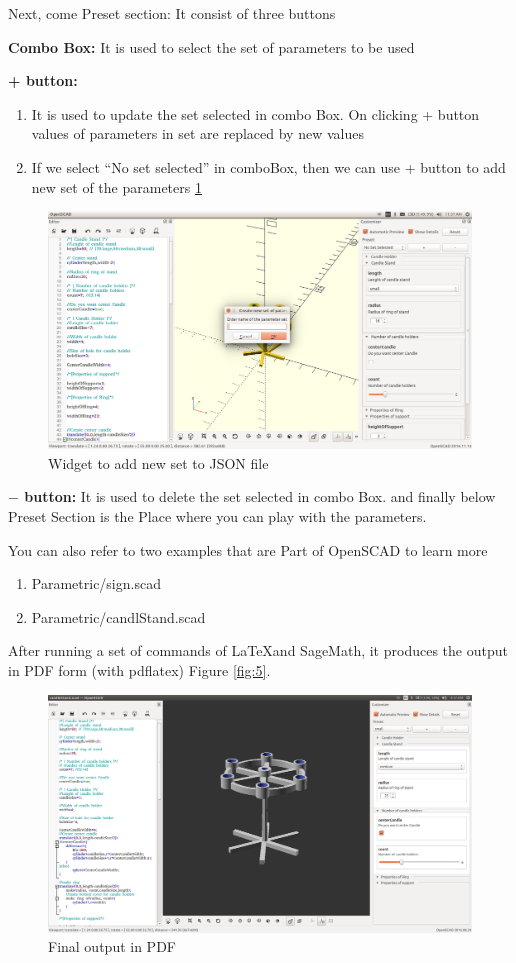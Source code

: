 Next, come Preset section: It consist of three buttons
\begin{description}
    \item \textbf{Combo Box:}
        It is used to select the set of parameters to be used
    \item \textbf{+ button:}
    \begin{enumerate}
        \item It is used to update the set selected in combo Box. On clicking + button values of parameters in set are replaced by new values
        \item If we select “No set selected” in comboBox, then we can use + button to add new set of the parameters \ref{fig:Add new set}
    \end{enumerate}
    \begin{figure}[H]
        \centering \includegraphics[scale=0.31]{images/output/7.png}
        \caption{Widget to add new set to JSON file}
        \label{fig:Add new set}
    \end{figure}

    \item \textbf{$-$ button: }
        It is used to delete the set selected in combo Box.
    and finally below Preset Section is the Place where you can play with the parameters.
\end{description}


You can also refer to  two examples that are Part of OpenSCAD to learn more
\begin{enumerate}
    \item Parametric/sign.scad
    \item Parametric/candlStand.scad
\end{enumerate}

After running a set of commands of \LaTeX and SageMath, it produces the
output in PDF form (with pdflatex) Figure \ref{fig:5}.

\begin{figure}[H]
\centering \includegraphics[scale=0.31]{images/output/9.png}
\caption{Final output in PDF}
\label{fig:8}
\end{figure}